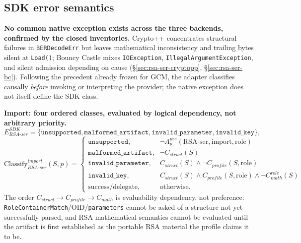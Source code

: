 \documentclass[11pt,a4paper]{article}
\begin{document}
\subsection{SDK error semantics}\label{sec:rsa-ser-errors}

\textbf{No common native exception exists across the three backends, confirmed by the closed inventories.} Crypto++ concentrates structural failures in \texttt{BERDecodeErr} but leaves mathematical inconsistency and trailing bytes silent at \texttt{Load()}; Bouncy Castle mixes \texttt{IOException}, \texttt{IllegalArgumentException}, and silent admission depending on cause (\S\ref{sec:rsa-ser-cryptopp}, \S\ref{sec:rsa-ser-bc}). Following the precedent already frozen for GCM, the adapter classifies causally \emph{before} invoking or interpreting the provider; the native exception does not itself define the SDK class.

\textbf{Import: four ordered classes, evaluated by logical dependency, not arbitrary priority.}
\[
E_{RSA\text{-}ser}^{SDK} = \{\texttt{unsupported}, \texttt{malformed\_artifact}, \texttt{invalid\_parameter}, \texttt{invalid\_key}\},
\]
\[
\text{Classify}_{RSA\text{-}ser}^{import}(S,p) =
\begin{cases}
\texttt{unsupported}, & \neg A_p^{pre}(\text{RSA-ser},\text{import},\text{role}) \\
\texttt{malformed\_artifact}, & \neg C_{struct}(S) \\
\texttt{invalid\_parameter}, & C_{struct}(S) \wedge \neg C_{profile}(S,\text{role}) \\
\texttt{invalid\_key}, & C_{struct}(S) \wedge C_{profile}(S,\text{role}) \wedge \neg C_{math}^{role}(S) \\
\text{success/delegate}, & \text{otherwise}.
\end{cases}
\]
The order $C_{struct} \to C_{profile} \to C_{math}$ is evaluability dependency, not preference: \texttt{RoleContainerMatch}/OID/\texttt{parameters} cannot be asked of a structure not yet successfully parsed, and RSA mathematical semantics cannot be evaluated until the artifact is first established as the portable RSA material the profile claims it to be.
\end{document}
